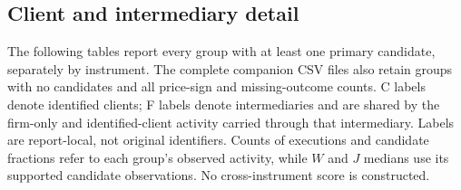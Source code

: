 \documentclass[11pt]{article}
\begin{document}
\FloatBarrier
\subsection{Client and intermediary detail}
\label{subsec:participant_group_details}

The following tables report every group with at least one primary candidate, separately by instrument. The complete companion CSV files also retain groups with no candidates and all price-sign and missing-outcome counts. C labels denote identified clients; F labels denote intermediaries and are shared by the firm-only and identified-client activity carried through that intermediary. Labels are report-local, not original identifiers. Counts of executions and candidate fractions refer to each group's observed activity, while $W$ and $J$ medians use its supported candidate observations. No cross-instrument score is constructed.



\endgroup
\end{document}
